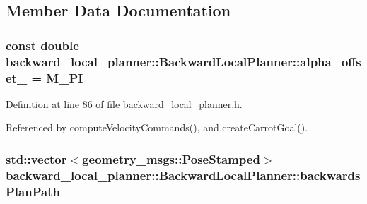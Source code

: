 \subsection{Member Data Documentation}
\subsubsection[{\texorpdfstring{alpha\+\_\+offset\+\_\+}{alpha_offset_}}]{\setlength{\rightskip}{0pt plus 5cm}const double backward\+\_\+local\+\_\+planner\+::\+Backward\+Local\+Planner\+::alpha\+\_\+offset\+\_\+ = M\+\_\+\+PI\hspace{0.3cm}{\ttfamily [private]}}\hypertarget{classbackward__local__planner_1_1BackwardLocalPlanner_a5897f084e4829cb5edd2f1fce5fe2546}{}\label{classbackward__local__planner_1_1BackwardLocalPlanner_a5897f084e4829cb5edd2f1fce5fe2546}


Definition at line 86 of file backward\+\_\+local\+\_\+planner.\+h.



Referenced by compute\+Velocity\+Commands(), and create\+Carrot\+Goal().

\subsubsection[{\texorpdfstring{backwards\+Plan\+Path\+\_\+}{backwardsPlanPath_}}]{\setlength{\rightskip}{0pt plus 5cm}std\+::vector$<$geometry\+\_\+msgs\+::\+Pose\+Stamped$>$ backward\+\_\+local\+\_\+planner\+::\+Backward\+Local\+Planner\+::backwards\+Plan\+Path\+\_\+\hspace{0.3cm}{\ttfamily [private]}}\hypertarget{classbackward__local__planner_1_1BackwardLocalPlanner_aaa37c16e1735cb440986b3d41e6ef8e6}{}\label{classbackward__local__planner_1_1BackwardLocalPlanner_aaa37c16e1735cb440986b3d41e6ef8e6}


